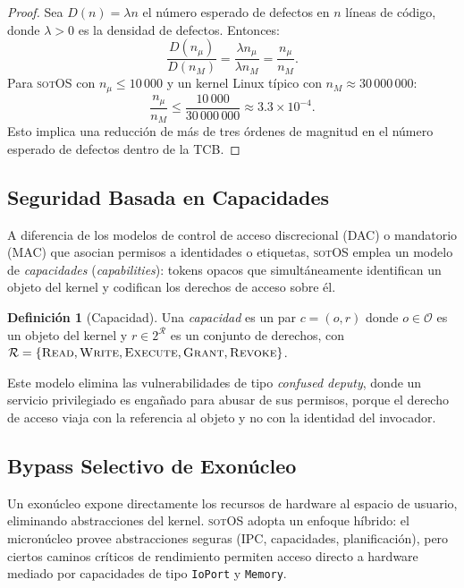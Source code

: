 \documentclass[11pt,twoside,openright]{book}
\theoremstyle{definition}
\newtheorem{definition}{Definición}[chapter]
\theoremstyle{plain}
\theoremstyle{remark}
\newcommand{\sotos}{\textsc{sotOS}}
\newcommand{\rights}{\mathcal{R}}
\begin{document}
\begin{proof}
Sea $D(n) = \lambda n$ el número esperado de defectos en $n$ líneas de código, donde
$\lambda > 0$ es la densidad de defectos. Entonces:
\[
    \frac{D(n_\mu)}{D(n_M)} = \frac{\lambda n_\mu}{\lambda n_M} = \frac{n_\mu}{n_M}.
\]
Para \sotos{} con $n_\mu \leq 10\,000$ y un kernel Linux típico con $n_M \approx 30\,000\,000$:
\[
    \frac{n_\mu}{n_M} \leq \frac{10\,000}{30\,000\,000} \approx 3.3 \times 10^{-4}.
\]
Esto implica una reducción de más de tres órdenes de magnitud en el número esperado de
defectos dentro de la TCB.
\end{proof}

\subsection{Seguridad Basada en Capacidades}

A diferencia de los modelos de control de acceso discrecional (DAC) o mandatorio (MAC)
que asocian permisos a identidades o etiquetas, \sotos{} emplea un modelo de
\emph{capacidades} (\emph{capabilities}): tokens opacos que simultáneamente identifican
un objeto del kernel y codifican los derechos de acceso sobre él.

\begin{definition}[Capacidad]
\label{def:capability}
Una \emph{capacidad} es un par $c = (o, r)$ donde $o \in \mathcal{O}$ es un objeto del
kernel y $r \in 2^{\rights}$ es un conjunto de derechos, con
$\rights = \{\textsc{Read}, \textsc{Write}, \textsc{Execute}, \textsc{Grant}, \textsc{Revoke}\}$.
\end{definition}

Este modelo elimina las vulnerabilidades de tipo \emph{confused deputy}, donde un servicio
privilegiado es engañado para abusar de sus permisos, porque el derecho de acceso viaja
con la referencia al objeto y no con la identidad del invocador.

\subsection{Bypass Selectivo de Exonúcleo}

Un exonúcleo expone directamente los recursos de hardware al espacio de usuario,
eliminando abstracciones del kernel. \sotos{} adopta un enfoque híbrido: el micronúcleo
provee abstracciones seguras (IPC, capacidades, planificación), pero ciertos caminos
críticos de rendimiento permiten acceso directo a hardware mediado por capacidades de
tipo \texttt{IoPort} y \texttt{Memory}.
\end{document}
